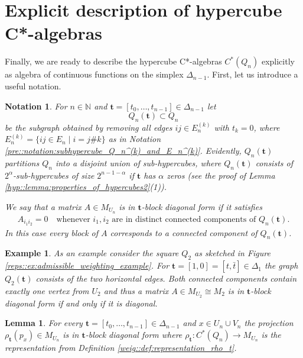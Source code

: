 \documentclass[a4paper]{amsart}
\newcommand{\N}{\mathbb{N}}
\newtheorem{example}[thm]{Example}
\newtheorem{lemma}[thm]{Lemma}
\newtheorem{notation}[thm]{Notation}
\begin{document}
\section{Explicit description of hypercube C*-algebras}
\label{sec::explicit_description_of_hypercube_algebras}

Finally, we are ready to describe the hypercube C*-algebras $C^\ast(Q_n)$ explicitly as algebra of continuous functions on the simplex $\Delta_{n-1}$. First, let us introduce a useful notation.

\begin{notation}
    For $n \in \N$ and $\mathbf{t} = [t_0, \dots, t_{n-1}] \in \Delta_{n-1}$ let 
    $$
    Q_n(\mathbf{t}) \subset Q_n
    $$ 
    be the subgraph obtained by removing all edges $ij \in E_n^{(k)}$ with $t_k = 0$, where $E_n^{(k)} = \{ ij \in E_n \mid i = j \# k \}$ as in Notation \ref{pre::notation:subhypercube_Q_n^(k)_and_E_n^(k)}. Evidently, $Q_n(\mathbf{t})$ partitions $Q_n$ into a disjoint union of sub-hypercubes, where $Q_n(\mathbf{t})$ consists of $2^\alpha$-sub-hypercubes of size $2^{n-1-\alpha}$ if $\mathbf{t}$ has $\alpha$ zeros (see the proof of Lemma \ref{hyp::lemma:properties_of_hypercubes2}(1)). 

    We say that a matrix $A \in M_{U_n}$ is in \emph{$\mathbf{t}$-block diagonal form} if it satisfies
    \begin{align*}
        A_{i_1i_2} = 0 \quad \text{whenever } i_1, i_2 \text{ are in distinct connected components of } Q_n(\mathbf{t}).
    \end{align*}
    In this case every block of $A$ corresponds to a connected component of $Q_n(\mathbf{t})$. 
\end{notation}

\begin{example}
    As an example consider the square $Q_2$ as sketched in Figure \ref{reps::ex:admissible_weighting_example}. For $\mathbf{t} = [1,0] = [t, \bar{t}] \in \Delta_1$ the graph $Q_2(\mathbf{t})$ consists of the two horizontal edges. Both connected components contain exactly one vertex from $U_2$ and thus a matrix $A \in M_{U_2} \cong M_2$ is in $\mathbf{t}$-block diagonal form if and only if it is diagonal. 
\end{example}

\begin{lemma}
    \label{expl::lemma:projections_are_block_diagonal}
    For every $\mathbf{t} = [t_0, \dots, t_{n-1}] \in \Delta_{n-1}$ and $x \in U_n \cup V_n$ the projection $\rho_\mathbf{t}(p_x) \in M_{U_n}$ is in $\mathbf{t}$-block diagonal form where $\rho_\mathbf{t}: C^\ast(Q_n) \to M_{U_n}$ is the representation from Definition \ref{weig::def:representation_rho_t}.
\end{lemma}
\end{document}
